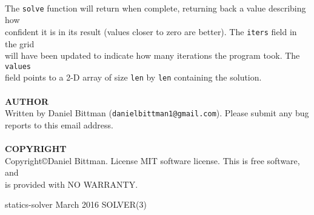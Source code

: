 \begin{tabbing}
	\\
	\> The \texttt{solve} function will return when complete, returning back a value describing how\\
	\> confident it is in its result (values closer to zero are better). The \texttt{iters} field in the grid\\
	\> will have been updated to indicate how many iterations the program took. The \texttt{values}\\
	\> field points to a 2-D array of size \texttt{len} by \texttt{len} containing the solution.\\
	\\
	\textbf{AUTHOR}\\
	\> Written by Daniel Bittman (\texttt{danielbittman1@gmail.com}). Please submit any bug\\
	\> reports to this email address.\\
	\\
	\textbf{COPYRIGHT}\\
	\> Copyright\copyright Daniel Bittman. License MIT software license. This is free software, and\\
	\> is provided with NO WARRANTY.\\

\end{tabbing}
\begin{flushleft}
	statics-solver
	\hfill March 2016 \hfill
	SOLVER(3)
\end{flushleft}

